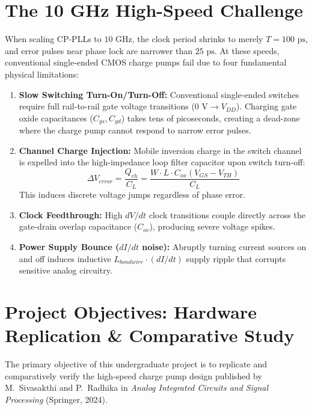 \documentclass[11pt,a4paper]{report}
\begin{document}
\section{The 10 GHz High-Speed Challenge}
When scaling CP-PLLs to $10\text{ GHz}$, the clock period shrinks to merely $T = 100\text{ ps}$, and error pulses near phase lock are narrower than $25\text{ ps}$. At these speeds, conventional single-ended CMOS charge pumps fail due to four fundamental physical limitations:
\begin{enumerate}[label=\textbf{\arabic*.}]
    \item \textbf{Slow Switching Turn-On/Turn-Off:} Conventional single-ended switches require full rail-to-rail gate voltage transitions ($0\text{ V} \to V_{DD}$). Charging gate oxide capacitances ($C_{gs}, C_{gd}$) takes tens of picoseconds, creating a dead-zone where the charge pump cannot respond to narrow error pulses.
    \item \textbf{Channel Charge Injection:} Mobile inversion charge in the switch channel is expelled into the high-impedance loop filter capacitor upon switch turn-off:
    \begin{equation}
        \Delta V_{error} = \frac{Q_{ch}}{C_L} = \frac{W \cdot L \cdot C_{ox} (V_{GS} - V_{TH})}{C_L}
    \end{equation}
    This induces discrete voltage jumps regardless of phase error.
    \item \textbf{Clock Feedthrough:} High $dV/dt$ clock transitions couple directly across the gate-drain overlap capacitance ($C_{ov}$), producing severe voltage spikes.
    \item \textbf{Power Supply Bounce ($dI/dt$ noise):} Abruptly turning current sources on and off induces inductive $L_{bondwire} \cdot (dI/dt)$ supply ripple that corrupts sensitive analog circuitry.
\end{enumerate}

\section{Project Objectives: Hardware Replication \& Comparative Study}
The primary objective of this undergraduate project is to replicate and comparatively verify the high-speed charge pump design published by M.~Sivasakthi and P.~Radhika in \textit{Analog Integrated Circuits and Signal Processing} (Springer, 2024).
\end{document}
